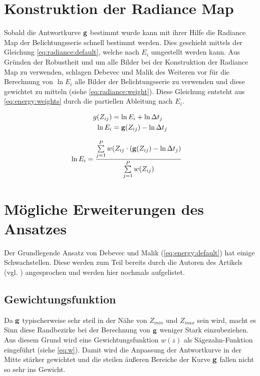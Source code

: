 \section{Konstruktion der Radiance Map}
\label{sec:algo:radiance}
Sobald die Antwortkurve $\mathbf g$ bestimmt wurde kann mit ihrer Hilfe die \gls{Radiance Map} der Belichtungsserie schnell bestimmt werden.
Dies geschieht mittels der Gleichung \autoref{eq:radiance:default}, welche nach $E_i$ umgestellt werden kann. Aus Gründen der Robustheit und um alle Bilder bei der Konstruktion der \gls{Radiance Map} zu verwenden, schlagen Debevec und Malik des Weiteren vor für die Berechnung von $\ln E_i$ alle Bilder der Belichtungsserie zu verwenden und diese gewichtet zu mitteln (siehe \autoref{eq:radiance:weight}). Diese Gleichung entsteht aus \autoref{eq:energy:weights} durch die partiellen Ableitung nach $E_i$.

\begin{align}
\label{eq:radiance:default}
g(Z_{ij}) &= \ln E_i + \ln \Delta t_j\\
\ln E_i &= \mathbf g(Z_{ij})-\ln \Delta t_j
\end{align}

\begin{align}
\label{eq:radiance:weight}
\ln E_i &= \frac{\sum \limits_{j=1}^P w(Z_{ij} \cdot (\mathbf g(Z_{ij})-\ln \Delta t_j)}{\sum \limits_{j=1}^P w(Z_{ij})}
\end{align}

\section{Mögliche Erweiterungen des Ansatzes}
\label{algo:schwachstellen}
Der Grundlegende Ansatz von Debevec und Malik (\autoref{eq:energy:default}) hat einige Schwachstellen. Diese werden zum Teil bereits durch die Autoren des Artikels (vgl. \cite{paper}) angesprochen und werden hier nochmals aufgelistet.
\subsection{Gewichtungsfunktion}
\label{algo:schwachstellen:gewichtung}
Da $\mathbf g$ typischerweise sehr steil in der Nähe von $Z_{min}$ und $Z_{max}$ sein wird, macht es Sinn diese Randbezirke bei der Berechnung von $\mathbf g$ weniger Stark einzubeziehen. Aus diesem Grund wird eine Gewichtungsfunktion $w(z)$ als Sägezahn-Funktion eingeführt (siehe \autoref{eq:w}). Damit wird die Anpassung der \gls{Antwortkurve} in der Mitte stärker gewichtet und die steilen äußeren Bereiche der Kurve $\mathbf g$ fallen nicht so sehr ins Gewicht.

